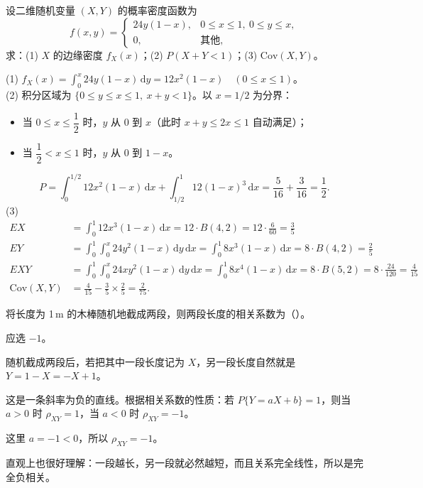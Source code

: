 ﻿\documentclass[lang=cn,11pt]{elegantbook}
\begin{document}
\begin{exercise}\label{exer:4-dens-24y}
设二维随机变量 \((X,Y)\) 的概率密度函数为
\[
f(x,y) = \begin{cases} 24y(1-x), & 0 \leqslant x \leqslant 1,\ 0 \leqslant y \leqslant x, \\ 0, & \text{其他}, \end{cases}
\]
求：(1) \(X\) 的边缘密度 \(f_X(x)\)；(2) \(P(X + Y < 1)\)；(3) \(\mathrm{Cov}(X,Y)\)。
\end{exercise}
\begin{solution}
(1) \(f_X(x) = \displaystyle\int_0^x 24y(1-x)\,\mathrm{d}y = 12x^2(1-x)\quad(0 \leqslant x \leqslant 1)\)。\\
(2) 积分区域为 \(\{0 \leqslant y \leqslant x \leqslant 1,\ x + y < 1\}\)。以 \(x = 1/2\) 为分界：
\begin{itemize}
    \item 当 \(0 \leqslant x \leqslant \dfrac{1}{2}\) 时，\(y\) 从 0 到 \(x\)（此时 \(x + y \leqslant 2x \leqslant 1\) 自动满足）；
    \item 当 \(\dfrac{1}{2} < x \leqslant 1\) 时，\(y\) 从 0 到 \(1 - x\)。
\end{itemize}
\[
P = \int_0^{1/2} 12x^2(1-x)\,\mathrm{d}x + \int_{1/2}^1 12(1-x)^3\,\mathrm{d}x
= \frac{5}{16} + \frac{3}{16} = \frac{1}{2}.
\]
(3)
\begin{align*}
EX &= \int_0^1 12x^3(1-x)\,\mathrm{d}x = 12\cdot B(4,2) = 12\cdot\frac{6}{60} = \frac{3}{5}\\
EY &= \int_0^1\!\!\int_0^x 24y^2(1-x)\,\mathrm{d}y\,\mathrm{d}x = \int_0^1 8x^3(1-x)\,\mathrm{d}x = 8\cdot B(4,2) = \frac{2}{5}\\
EXY &= \int_0^1\!\!\int_0^x 24xy^2(1-x)\,\mathrm{d}y\,\mathrm{d}x = \int_0^1 8x^4(1-x)\,\mathrm{d}x = 8\cdot B(5,2) = 8\cdot\frac{24}{120} = \frac{4}{15}\\
\mathrm{Cov}(X,Y) &= \frac{4}{15} - \frac{3}{5} \times \frac{2}{5} = \frac{2}{75}.
\end{align*}
\end{solution}

\begin{exercise}\label{exer:4-13-stick}
将长度为 1\,m 的木棒随机地截成两段，则两段长度的相关系数为（\quad）。
\end{exercise}
\begin{solution}
应选 \(-1\)。

随机截成两段后，若把其中一段长度记为 \(X\)，另一段长度自然就是 \(Y=1-X=-X+1\)。

这是一条斜率为负的直线。根据相关系数的性质：若 \(P\{Y=aX+b\}=1\)，则当 \(a>0\) 时 \(\rho_{XY}=1\)，当 \(a<0\) 时 \(\rho_{XY}=-1\)。

这里 \(a=-1<0\)，所以 \(\rho_{XY}=-1\)。

直观上也很好理解：一段越长，另一段就必然越短，而且关系完全线性，所以是完全负相关。
\end{solution}
\end{document}
